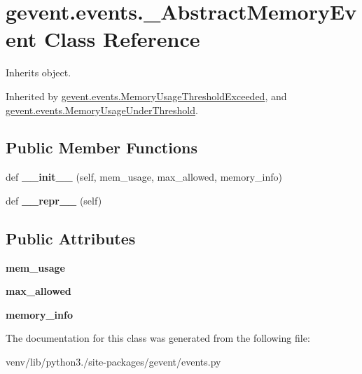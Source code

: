 \hypertarget{classgevent_1_1events_1_1___abstract_memory_event}{}\section{gevent.\+events.\+\_\+\+Abstract\+Memory\+Event Class Reference}
\label{classgevent_1_1events_1_1___abstract_memory_event}


Inherits object.



Inherited by \hyperlink{classgevent_1_1events_1_1_memory_usage_threshold_exceeded}{gevent.\+events.\+Memory\+Usage\+Threshold\+Exceeded}, and \hyperlink{classgevent_1_1events_1_1_memory_usage_under_threshold}{gevent.\+events.\+Memory\+Usage\+Under\+Threshold}.

\subsection*{Public Member Functions}
\begin{DoxyCompactItemize}
\item 
\mbox{\label{classgevent_1_1events_1_1___abstract_memory_event_a9e25ffa0685865df51372ca9d2f105a6}} 
def {\bfseries \+\_\+\+\_\+init\+\_\+\+\_\+} (self, mem\+\_\+usage, max\+\_\+allowed, memory\+\_\+info)
\item 
\mbox{\label{classgevent_1_1events_1_1___abstract_memory_event_aca858e7c170aa29a93187953676f676a}} 
def {\bfseries \+\_\+\+\_\+repr\+\_\+\+\_\+} (self)
\end{DoxyCompactItemize}
\subsection*{Public Attributes}
\begin{DoxyCompactItemize}
\item 
\mbox{\label{classgevent_1_1events_1_1___abstract_memory_event_a7baf3bd763e984303f5c83bca4fe6d22}} 
{\bfseries mem\+\_\+usage}
\item 
\mbox{\label{classgevent_1_1events_1_1___abstract_memory_event_aa62bcca76237e1bef2bd771276ed5703}} 
{\bfseries max\+\_\+allowed}
\item 
\mbox{\label{classgevent_1_1events_1_1___abstract_memory_event_a6871d673cdce54e0bdbf28dc8dfac1d9}} 
{\bfseries memory\+\_\+info}
\end{DoxyCompactItemize}


The documentation for this class was generated from the following file\+:\begin{DoxyCompactItemize}
\item 
venv/lib/python3./site-\/packages/gevent/events.\+py\end{DoxyCompactItemize}
